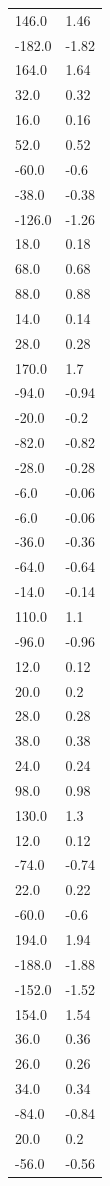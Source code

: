 \begin{longtable}{ll}
146.0 & 1.46 \\
-182.0 & -1.82 \\
164.0 & 1.64 \\
32.0 & 0.32 \\
16.0 & 0.16 \\
52.0 & 0.52 \\
-60.0 & -0.6 \\
-38.0 & -0.38 \\
-126.0 & -1.26 \\
18.0 & 0.18 \\
68.0 & 0.68 \\
88.0 & 0.88 \\
14.0 & 0.14 \\
28.0 & 0.28 \\
170.0 & 1.7 \\
-94.0 & -0.94 \\
-20.0 & -0.2 \\
-82.0 & -0.82 \\
-28.0 & -0.28 \\
-6.0 & -0.06 \\
-6.0 & -0.06 \\
-36.0 & -0.36 \\
-64.0 & -0.64 \\
-14.0 & -0.14 \\
110.0 & 1.1 \\
-96.0 & -0.96 \\
12.0 & 0.12 \\
20.0 & 0.2 \\
28.0 & 0.28 \\
38.0 & 0.38 \\
24.0 & 0.24 \\
98.0 & 0.98 \\
130.0 & 1.3 \\
12.0 & 0.12 \\
-74.0 & -0.74 \\
22.0 & 0.22 \\
-60.0 & -0.6 \\
194.0 & 1.94 \\
-188.0 & -1.88 \\
-152.0 & -1.52 \\
154.0 & 1.54 \\
36.0 & 0.36 \\
26.0 & 0.26 \\
34.0 & 0.34 \\
-84.0 & -0.84 \\
20.0 & 0.2 \\
-56.0 & -0.56 \\

\end{longtable}

